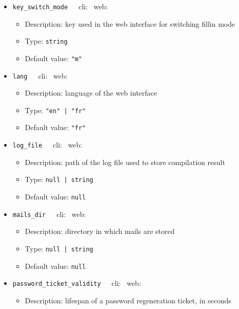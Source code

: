 {\begin{itemize}[itemsep=0pt,parsep=0pt,topsep=0pt,partopsep=0pt]
\begin{itemize}[itemsep=0pt,parsep=0pt,topsep=0pt,partopsep=0pt]
  \item Description:  key used in the web interface to move to the previous question
  \item Type:  {\tt{string}}
  \item Default value:  {\tt{"q"}}
  \end{itemize}
\item{\tt{key\_switch\_mode}}~~~cli: \xmark~web: \cmark
  \begin{itemize}[itemsep=0pt,parsep=0pt,topsep=0pt,partopsep=0pt]
  \item Description:  key used in the web interface for switching fillin mode
  \item Type:  {\tt{string}}
  \item Default value:  {\tt{"m"}}
  \end{itemize}
\item{\tt{lang}}~~~cli: \xmark~web: \cmark
  \begin{itemize}[itemsep=0pt,parsep=0pt,topsep=0pt,partopsep=0pt]
  \item Description:  language of the web interface
  \item Type:  {\tt{"en" | "fr"}}
  \item Default value:  {\tt{"fr"}}
  \end{itemize}
\item{\tt{log\_file}}~~~cli: \cmark~web: \xmark
  \begin{itemize}[itemsep=0pt,parsep=0pt,topsep=0pt,partopsep=0pt]
  \item Description:  path of the log file used to store compilation result
  \item Type:  {\tt{null | string}}
  \item Default value:  {\tt{null}}
  \end{itemize}
\item{\tt{mails\_dir}}~~~cli: \xmark~web: \cmark
  \begin{itemize}[itemsep=0pt,parsep=0pt,topsep=0pt,partopsep=0pt]
  \item Description:  directory in which mails are stored
  \item Type:  {\tt{null | string}}
  \item Default value:  {\tt{null}}
  \end{itemize}
\item{\tt{password\_ticket\_validity}}~~~cli: \xmark~web: \cmark
  \begin{itemize}[itemsep=0pt,parsep=0pt,topsep=0pt,partopsep=0pt]
  \item Description:  lifespan of a password regeneration ticket, in seconds

\end{itemize}
\end{itemize}}
